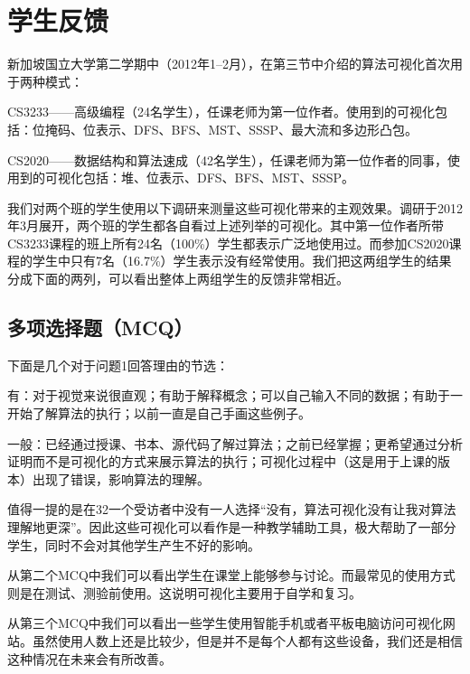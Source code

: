 \chapter{学生反馈}
\begin{sectext}
新加坡国立大学第二学期中（2012年1--2月），在第三节中介绍的算法可视化首次用于两种模式：
\begin{itemlist}
\item CS3233——高级编程（24名学生），任课老师为第一位作者。使用到的可视化包括：位掩码、位表示、DFS、BFS、MST、SSSP、最大流和多边形凸包。

\item CS2020——数据结构和算法速成（42名学生），任课老师为第一位作者的同事，使用到的可视化包括：堆、位表示、DFS、BFS、MST、SSSP。
\end{itemlist}

我们对两个班的学生使用以下调研来测量这些可视化带来的主观效果。调研于2012年3月展开，两个班的学生都各自看过上述列举的可视化。其中第一位作者所带CS3233课程的班上所有24名（100\%）学生都表示广泛地使用过。而参加CS2020课程的学生中只有7名（16.7\%）学生表示没有经常使用。我们把这两组学生的结果分成下面的两列，可以看出整体上两组学生的反馈非常相近。
\end{sectext}
\section{多项选择题（MCQ）}
\begin{sectext}

下面是几个对于问题1回答理由的节选：

有：对于视觉来说很直观；有助于解释概念；可以自己输入不同的数据；有助于一开始了解算法的执行；以前一直是自己手画这些例子。

一般：已经通过授课、书本、源代码了解过算法；之前已经掌握；更希望通过分析证明而不是可视化的方式来展示算法的执行；可视化过程中（这是用于上课的版本）出现了错误，影响算法的理解。

值得一提的是在32一个受访者中没有一人选择``没有，算法可视化没有让我对算法理解地更深''。因此这些可视化可以看作是一种教学辅助工具，极大帮助了一部分学生，同时不会对其他学生产生不好的影响。

从第二个MCQ中我们可以看出学生在课堂上能够参与讨论。而最常见的使用方式则是在测试、测验前使用。这说明可视化主要用于自学和复习。

从第三个MCQ中我们可以看出一些学生使用智能手机或者平板电脑访问可视化网站。虽然使用人数上还是比较少，但是并不是每个人都有这些设备，我们还是相信这种情况在未来会有所改善。
\end{sectext}
